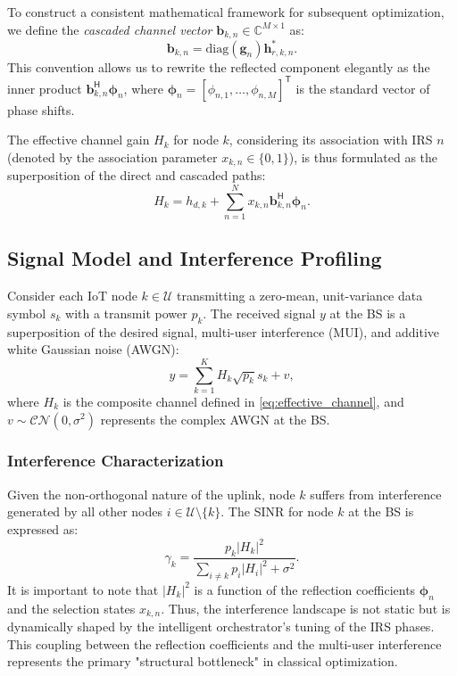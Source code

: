 \documentclass[journal]{IEEEtran}
\newcommand{\herm}{^{\mathsf{H}}}
\newcommand{\trans}{^{\mathsf{T}}}
\begin{document}
To construct a consistent mathematical framework for subsequent optimization, we define the \textit{cascaded channel vector} $\mathbf{b}_{k,n} \in \mathbb{C}^{M \times 1}$ as:
\begin{equation}
    \mathbf{b}_{k,n} = \text{diag}(\mathbf{g}_{n}) \mathbf{h}_{r,k,n}^*.
\end{equation}
This convention allows us to rewrite the reflected component elegantly as the inner product $\mathbf{b}_{k,n}\herm \boldsymbol{\phi}_n$, where $\boldsymbol{\phi}_n = [\phi_{n,1}, \dots, \phi_{n,M}]\trans$ is the standard vector of phase shifts.

The effective channel gain $H_{k}$ for node $k$, considering its association with IRS $n$ (denoted by the association parameter $x_{k,n} \in \{0,1\}$), is thus formulated as the superposition of the direct and cascaded paths:
\begin{equation}
    H_{k} = h_{d,k} + \sum_{n=1}^{N} x_{k,n} \mathbf{b}_{k,n}\herm \boldsymbol{\phi}_n.
    \label{eq:effective_channel}
\end{equation}

\subsection{Signal Model and Interference Profiling}
\label{subsec:signal_model}

Consider each IoT node $k \in \mathcal{U}$ transmitting a zero-mean, unit-variance data symbol $s_k$ with a transmit power $p_k$. The received signal $y$ at the BS is a superposition of the desired signal, multi-user interference (MUI), and additive white Gaussian noise (AWGN):
\begin{equation}
    y = \sum_{k=1}^{K} H_k \sqrt{p_k} s_k + v,
\end{equation}
where $H_k$ is the composite channel defined in \eqref{eq:effective_channel}, and $v \sim \mathcal{CN}(0, \sigma^2)$ represents the complex AWGN at the BS.

\subsubsection{Interference Characterization}
\label{subsubsec:sinr}

Given the non-orthogonal nature of the uplink, node $k$ suffers from interference generated by all other nodes $i \in \mathcal{U} \setminus \{k\}$. The SINR for node $k$ at the BS is expressed as:
\begin{equation}
    \gamma_k = \frac{p_k |H_k|^2}{\sum_{i \neq k} p_i |H_i|^2 + \sigma^2}.
\end{equation}
It is important to note that $|H_k|^2$ is a function of the reflection coefficients $\boldsymbol{\phi}_n$ and the selection states $x_{k,n}$. Thus, the interference landscape is not static but is dynamically shaped by the intelligent orchestrator's tuning of the IRS phases. This coupling between the reflection coefficients and the multi-user interference represents the primary "structural bottleneck" in classical optimization.
\end{document}

